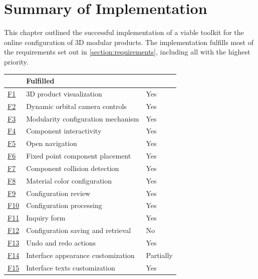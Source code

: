 \section{Summary of Implementation} \label{section:requirmenets-evaulation}

This chapter outlined the successful implementation of a viable toolkit for the online configuration of 3D modular products. The implementation fulfills most of the requirements set out in \autoref{section:requirements}, including all with the highest priority.

\begin{table}[htb]
\centering
\begin{tabular}{>{\raggedright\arraybackslash}p{0.5cm} >{\raggedright\arraybackslash}p{8cm} >{\centering\arraybackslash}p{2cm}}
\toprule
\multicolumn{2}{c}{\textbf{Requirement}} &
\textbf{Fulfilled}\\ 
\midrule
\hyperref[itm:F1]{F1} & 3D product visualization &
    Yes \\
\hyperref[itm:F2]{F2} & Dynamic orbital camera controls &
    Yes \\
\hyperref[itm:F3]{F3} & Modularity configuration mechanism &
    Yes \\
\hyperref[itm:F4]{F4} & Component interactivity &
    Yes \\
\hyperref[itm:F5]{F5} & Open navigation &
    Yes \\
\hyperref[itm:F6]{F6} & Fixed point component placement &
    Yes \\
\hyperref[itm:F7]{F7} & Component collision detection &
    Yes \\
\hyperref[itm:F8]{F8} & Material color configuration &
    Yes \\
\hyperref[itm:F9]{F9} & Configuration review &
    Yes \\
\hyperref[itm:F10]{F10} & Configuration processing &
    Yes \\
\hyperref[itm:F11]{F11} & Inquiry form &
    Yes \\
\hyperref[itm:F12]{F12} & Configuration saving and retrieval &
    No \\
\hyperref[itm:F13]{F13} & Undo and redo actions &
    Yes \\
\hyperref[itm:F14]{F14} & Interface appearance customization &
    Partially \\
\hyperref[itm:F15]{F15} & Interface texts customization &
    Yes \\

\end{tabular}
\end{table}
